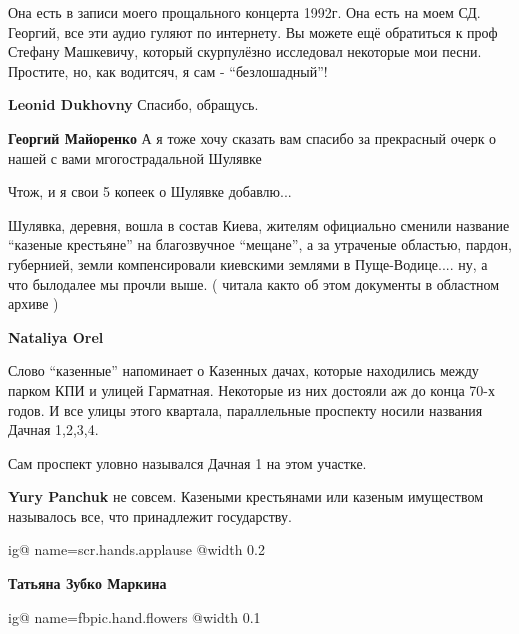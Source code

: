 \begin{itemize}
\begin{itemize}

Она есть в записи моего прощального концерта 1992г. Она есть на моем СД.
Георгий, все эти аудио гуляют по интернету. Вы можете ещё обратиться к проф
Стефану Машкевичу, который скурпулёзно исследовал некоторые мои песни.
Простите, но, как водитсяч, я сам - \enquote{безлошадный}!

\begin{itemize} %
\textbf{Leonid Dukhovny} Спасибо, обращусь.

\textbf{Георгий Майоренко} А я тоже хочу сказать вам спасибо за прекрасный очерк о нашей с вами мгогострадальной Шулявке
\end{itemize} %


\end{itemize} %


Чтож, и я свои 5 копеек о Шулявке добавлю...

Шулявка, деревня, вошла в состав Киева, жителям официально сменили название
\enquote{казеные крестьяне} на благозвучное \enquote{мещане}, а за утраченые
областью, пардон, губернией, земли компенсировали киевскими землями в
Пуще-Водице.... ну, а что былодалее мы прочли выше. ( читала както об этом
документы в областном архиве )

\begin{itemize} %
\textbf{Nataliya Orel} 

Слово \enquote{казенные} напоминает о Казенных дачах, которые находились между парком
КПИ и улицей Гарматная. Некоторые из них достояли аж до конца 70-х годов. И все
улицы этого квартала, параллельные проспекту носили названия Дачная 1,2,3,4.

Сам проспект уловно назывался Дачная 1 на этом участке.

\textbf{Yury Panchuk} не совсем. Казеными крестьянами или казеным имуществом называлось все, что принадлежит государству.
\end{itemize} %


\ifcmt
  ig@ name=scr.hands.applause
  @width 0.2
\fi

\textbf{Татьяна Зубко Маркина}

\ifcmt
  ig@ name=fbpic.hand.flowers
	@width 0.1
\fi



\end{itemize}
